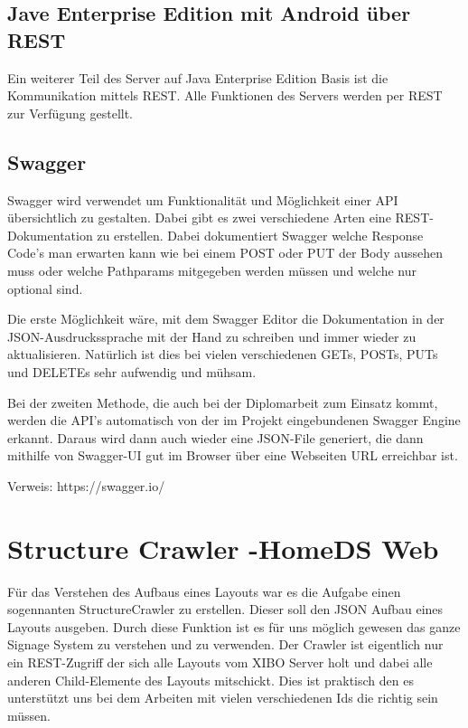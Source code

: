 \subsection{Jave Enterprise Edition mit Android über REST}\label{sec:javaeeandroidrest}
Ein weiterer Teil des Server auf Java Enterprise Edition Basis ist die Kommunikation mittels REST. Alle Funktionen des Servers werden per REST zur Verfügung gestellt.

\subsection{Swagger}\label{sec:javaeeandroidrestswagger}
Swagger wird verwendet um Funktionalität und Möglichkeit einer API übersichtlich zu gestalten. Dabei gibt es zwei verschiedene Arten eine REST-Dokumentation zu erstellen.
Dabei dokumentiert Swagger welche Response Code's man erwarten kann wie bei einem POST oder PUT der Body aussehen muss oder welche Pathparams mitgegeben werden müssen und welche nur optional sind.  

Die erste Möglichkeit wäre, mit dem Swagger Editor die Dokumentation in der JSON-Ausdruckssprache mit der Hand zu schreiben und immer wieder zu aktualisieren. Natürlich ist dies bei vielen verschiedenen GETs, POSTs, PUTs und DELETEs sehr aufwendig und mühsam.

Bei der zweiten Methode, die auch bei der Diplomarbeit zum Einsatz kommt, werden die API's automatisch von der im Projekt eingebundenen Swagger Engine erkannt. Daraus wird dann auch wieder eine JSON-File generiert, die dann mithilfe von Swagger-UI gut im Browser über eine Webseiten URL erreichbar ist.


Verweis: https://swagger.io/

\section{Structure Crawler -HomeDS Web}\label{sec:javaeestructurecrawler}
Für das Verstehen des Aufbaus eines Layouts war es die Aufgabe einen sogennanten StructureCrawler zu erstellen. Dieser soll den JSON Aufbau eines Layouts ausgeben. Durch diese Funktion ist es für uns möglich gewesen das ganze Signage System zu verstehen und zu verwenden. Der Crawler ist eigentlich nur ein REST-Zugriff der sich alle Layouts vom XIBO Server holt und dabei alle anderen Child-Elemente des Layouts mitschickt. Dies ist praktisch den es unterstützt uns bei dem Arbeiten mit vielen verschiedenen Ids die richtig sein müssen.


